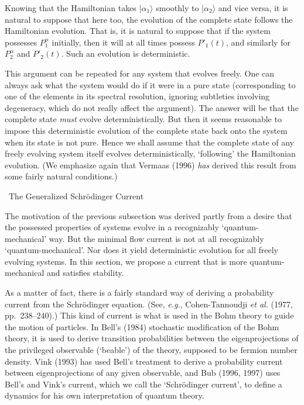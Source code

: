 \documentclass[12pt]{article}
\renewcommand{\subsection}[1]{\addtocounter{subsection}{1}
                           \setcounter{subsubsection}{0}
                           \vspace{20pt}
                           \begin{center}
                           \thesubsection \ #1
                           \end{center}
                           \vspace{20pt}}
\newcommand{\eg}{{\it e.g.}}
\newcommand{\ga}{\alpha}                                        %
\newcommand{\ket}[1]{\vert #1\rangle}                           %
\begin{document}
Knowing that the Hamiltonian takes $\ket{\ga_1}$ smoothly to 
$\ket{\ga_2}$ and vice versa, it is natural to suppose that here too, 
the evolution of the complete state follows the Hamiltonian evolution.  
That is, it is natural to suppose that if the system possesses 
$P^{\ga}_1$ initially, then it will at all times possess ${P'}_1(t)$, 
and similarly for $P^{\ga}_2$ and ${P'}_2(t)$.  Such an evolution is 
deterministic.

This argument can be repeated for any system that evolves freely.  One 
can always ask what the system would do if it were in a pure state 
(corresponding to one of the elements in its spectral resolution, 
ignoring subtleties involving degeneracy, which do not really affect 
the argument).  The answer will be that the complete state {\it must} 
evolve deterministically.  But then it seems reasonable to impose this 
deterministic evolution of the complete state back onto the system 
when its state is not pure.  Hence we shall assume that the complete 
state of any freely evolving system itself evolves deterministically, 
`following' the Hamiltonian evolution.  (We emphasize again that 
Vermaas (1996) {\it has} derived this result from some fairly natural 
conditions.)


\subsection{The Generalized Schr\"odinger Current}


The motivation of the previous subsection was derived partly from a
desire that the possessed properties of systems evolve in a
recognizably `quantum-mechanical' way.  But the minimal flow current
is not at all recognizably `quantum-mechanical'.  Nor does it yield
deterministic evolution for all freely evolving systems.  In this
section, we propose a current that is more quantum-mechanical and
satisfies stability.

As a matter of fact, there is a fairly standard way of deriving a 
probability current from the Schr\"odinger equation.  (See, \eg, 
Cohen-Tannoudji {\it et al.} (1977, pp.~238--240).) This kind of 
current is what is used in the Bohm theory to guide the motion of 
particles.  In Bell's (1984) stochastic modification of the Bohm 
theory, it is used to derive transition probabilities between the 
eigenprojections of the privileged observable (`beable') of the 
theory, supposed to be fermion number density.  Vink (1993) has used 
Bell's treatment to derive a probability current between 
eigenprojections of any given observable, and Bub (1996, 1997) uses 
Bell's and Vink's current, which we call the `Schr\"odinger current', 
to define a dynamics for his own interpretation of quantum theory.
\end{document}
